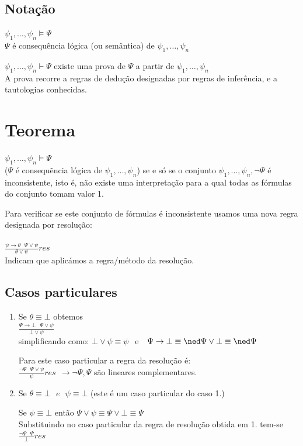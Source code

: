 \documentclass[11pt]{report}
\begin{document}
    \subsection*{Notação}
    $ \psi_1, \ldots, \psi_n \models \Psi $\\
    $\Psi$ é consequência lógica (ou semântica) de $\psi_1, \ldots, \psi_n$\\
    \par $\psi_1, \ldots, \psi_n \vdash \Psi$ existe uma prova de $\Psi$ a partir de $\psi_1, \ldots, \psi_n$\\
    A prova recorre a regras de dedução designadas por regras de inferência, e a tautologias conhecidas.

    \section*{Teorema}
    $\psi_1, \ldots, \psi_n \models \Psi$\\
    ($\Psi$ é consequẽncia lógica de $\psi_1, \ldots, \psi_n$) se e só se o conjunto ${{\psi_1, \ldots, \psi_n, \neg\Psi}}$ é inconsistente, isto é, não existe uma interpretação para a qual todas as fórmulas do conjunto tomam valor 1.
    \par Para verificar se este conjunto de fórmulas é inconsistente usamos uma nova regra designada por resolução:\\\\
    $ \frac{\psi \rightarrow \theta~~~\Psi\vee\psi}{\theta\vee\psi} res $\\Indicam que aplicámos a regra/método da resolução.
    \subsection*{Casos particulares}
    \begin{enumerate}
        \item{Se $ \theta \equiv \bot $ obtemos\\
            $\frac{\Psi \rightarrow \bot~~~\Psi\vee\psi}{\bot\vee\psi}$\\
            simplificando como: $\bot\vee\psi\equiv\psi~~$ e $~~\Psi\rightarrow\bot\equiv\ned\Psi\vee\bot\equiv\ned\Psi$
            \par Para este caso particular a regra da resolução é:\\
            $\frac{\neg\Psi~~~\Psi\vee\psi}{\psi} res ~~ \rightarrow \neg\Psi, \Psi $ são lineares complementares.
        }
        \item {
            Se $ \theta\equiv\bot~~~e~~~\psi\equiv\bot $ (este é um caso particular do caso 1.)
            \par Se $\psi\equiv\bot$ então $\Psi\vee\psi\equiv\Psi\vee\bot\equiv\Psi$\\
            Substituindo no caso particular da regra de resolução obtida em 1. tem-se\\
            $ \frac{\neg\Psi~~~\Psi}{\bot} res $
        }
    \end{enumerate}
\end{document}

